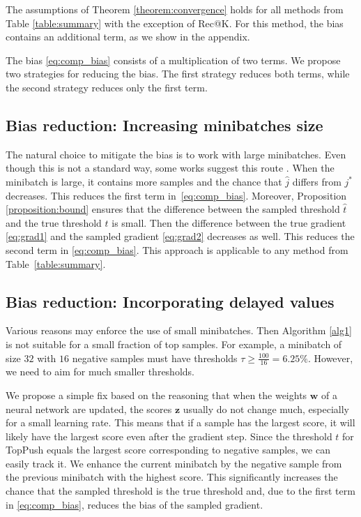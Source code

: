 The assumptions of Theorem \ref{theorem:convergence} holds for all methods from Table \ref{table:summary} with the exception of Rec@K. For this method, the bias contains an additional term, as we show in the appendix.

The bias \eqref{eq:comp_bias} consists of a multiplication of two terms. We propose two strategies for reducing the bias. The first strategy reduces both terms, while the second strategy reduces only the first term.

\subsection{Bias reduction: Increasing minibatches size}\label{sec:bias1}

The natural choice to mitigate the bias is to work with large minibatches. Even though this is not a standard way, some works suggest this route \cite{you2019large}. When the minibatch is large, it contains more samples and the chance that $\hat j$ differs from $j^*$ decreases. This reduces the first term in~\eqref{eq:comp_bias}. Moreover, Proposition \ref{proposition:bound} ensures that the difference between the sampled threshold $\hat t$ and the true threshold $t$ is small. Then the difference between the true gradient \eqref{eq:grad1} and the sampled gradient \eqref{eq:grad2} decreases as well. This reduces the second term in \eqref{eq:comp_bias}. This approach is applicable to any method from Table~\ref{table:summary}.

\subsection{Bias reduction: Incorporating delayed values}\label{sec:bias2}

Various reasons may enforce the use of small minibatches. Then Algorithm \ref{alg1} is not suitable for a small fraction of top samples. For example, a minibatch of size $32$ with $16$ negative samples must have thresholds $\tau\ge \frac{100}{16}=6.25\%$. However, we need to aim for much smaller thresholds.

We propose a simple fix based on the reasoning that when the weights $\bm{w}$ of a neural network are updated, the scores $\bm{z}$ usually do not change much, especially for a small learning rate. This means that if a sample has the largest score, it will likely have the largest score even after the gradient step. Since the threshold $t$ for TopPush equals the largest score corresponding to negative samples, we can easily track it. We enhance the current minibatch by the negative sample from the previous minibatch with the highest score. This significantly increases the chance that the sampled threshold is the true threshold and, due to the first term in \eqref{eq:comp_bias}, reduces the bias of the sampled gradient.

